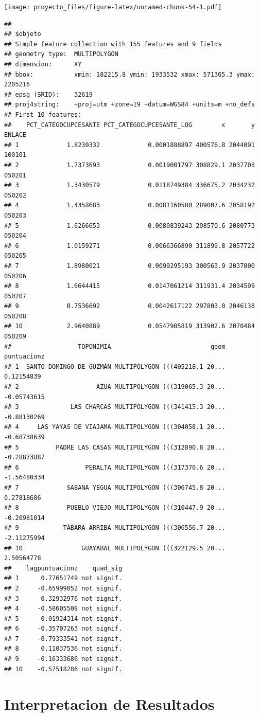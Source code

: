 \documentclass[11pt,]{article}
\begin{document}
\texttt{[image: proyecto\_files/figure-latex/unnamed-chunk-54-1.pdf]}

\begin{verbatim}
## 
## $objeto
## Simple feature collection with 155 features and 9 fields
## geometry type:  MULTIPOLYGON
## dimension:      XY
## bbox:           xmin: 182215.8 ymin: 1933532 xmax: 571365.3 ymax: 2205216
## epsg (SRID):    32619
## proj4string:    +proj=utm +zone=19 +datum=WGS84 +units=m +no_defs
## First 10 features:
##    PCT_CATEGOCUPCESANTE PCT_CATEGOCUPCESANTE_LOG        x       y ENLACE
## 1             1.8230332             0.0001888897 400576.8 2044091 100101
## 2             1.7373693             0.0019001797 308829.1 2037708 050201
## 3             1.3430579             0.0118749384 336675.2 2034232 050202
## 4             1.4358683             0.0081160580 289007.6 2058192 050203
## 5             1.6266653             0.0080839243 298570.6 2080773 050204
## 6             1.0159271             0.0066366890 311899.8 2057722 050205
## 7             1.8980021             0.0099295193 300563.9 2037000 050206
## 8             1.6644415             0.0147061214 311931.4 2034599 050207
## 9             0.7536692             0.0042617122 297803.0 2046138 050208
## 10            2.9640889             0.0547905819 313902.6 2070484 050209
##                  TOPONIMIA                           geom puntuacionz
## 1  SANTO DOMINGO DE GUZMÁN MULTIPOLYGON (((405218.1 20...  0.12154839
## 2                     AZUA MULTIPOLYGON (((319065.3 20... -0.05743615
## 3              LAS CHARCAS MULTIPOLYGON (((341415.3 20... -0.88130269
## 4     LAS YAYAS DE VIAJAMA MULTIPOLYGON (((304058.1 20... -0.68738639
## 5          PADRE LAS CASAS MULTIPOLYGON (((312890.8 20... -0.28873887
## 6                  PERALTA MULTIPOLYGON (((317370.6 20... -1.56480334
## 7             SABANA YEGUA MULTIPOLYGON (((306745.8 20...  0.27818686
## 8             PUEBLO VIEJO MULTIPOLYGON (((310447.9 20... -0.20981014
## 9            TÁBARA ARRIBA MULTIPOLYGON (((306556.7 20... -2.11275994
## 10                GUAYABAL MULTIPOLYGON (((322129.5 20...  2.50564778
##    lagpuntuacionz    quad_sig
## 1      0.77651749 not signif.
## 2     -0.65999052 not signif.
## 3     -0.32932976 not signif.
## 4     -0.58605508 not signif.
## 5      0.01924314 not signif.
## 6     -0.35707263 not signif.
## 7     -0.79333541 not signif.
## 8      0.11037536 not signif.
## 9     -0.16333686 not signif.
## 10    -0.57518286 not signif.
\end{verbatim}

\section{Interpretacion de
Resultados}\label{interpretacion-de-resultados}
\end{document}
